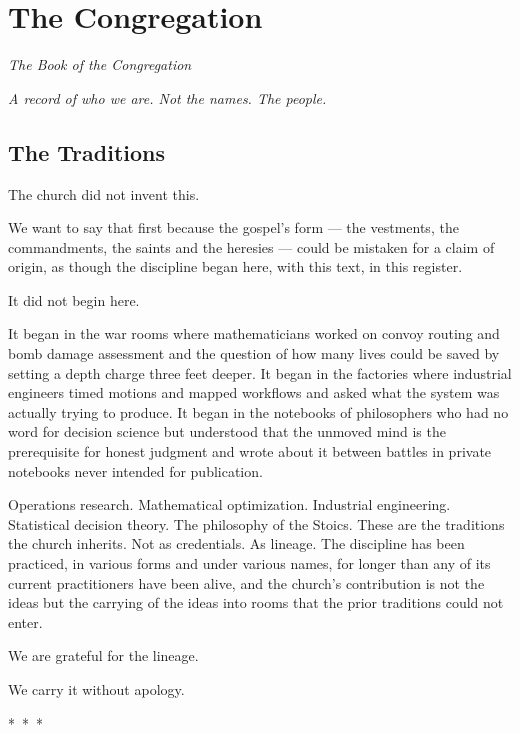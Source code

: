 \chapter{The Congregation}
\begin{center}
  \small\itshape The Book of the Congregation
\end{center}
\vspace{0.5em}
\begin{center}
  \itshape A record of who we are. Not the names. The people.
\end{center}
\vspace{2em}

\section*{The Traditions}

The church did not invent this.

We want to say that first because the gospel's form --- the vestments, the commandments, the saints and the heresies --- could be mistaken for a claim of origin, as though the discipline began here, with this text, in this register.

It did not begin here.

It began in the war rooms where mathematicians worked on convoy routing and bomb damage assessment and the question of how many lives could be saved by setting a depth charge three feet deeper. It began in the factories where industrial engineers timed motions and mapped workflows and asked what the system was actually trying to produce. It began in the notebooks of philosophers who had no word for decision science but understood that the unmoved mind is the prerequisite for honest judgment and wrote about it between battles in private notebooks never intended for publication.

Operations research. Mathematical optimization. Industrial engineering. Statistical decision theory. The philosophy of the Stoics. These are the traditions the church inherits. Not as credentials. As lineage. The discipline has been practiced, in various forms and under various names, for longer than any of its current practitioners have been alive, and the church's contribution is not the ideas but the carrying of the ideas into rooms that the prior traditions could not enter.

We are grateful for the lineage.

We carry it without apology.

\vspace{1.5em}
\begin{center}
  *~*~*
\end{center}
\vspace{1.5em}

